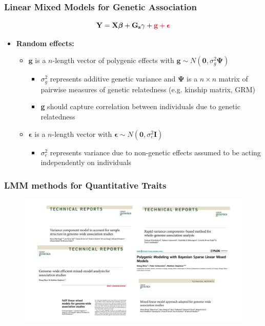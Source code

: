 \documentclass{beamer}
\newcommand{\bg}{\mathbf{g}}
\newcommand{\bepsilon}{\mbox{\boldmath$\epsilon$}}
\begin{document}
\begin{frame}
\frametitle{\bf Linear Mixed Models for Genetic Association}
\vspace{-5pt}
\begin{equation*}
\mathbf{Y}= \mathbf{X}\boldsymbol{\beta} + \mathbf{G_s}\gamma +  {\color{red}\bg  + \bepsilon }
\end{equation*}

\begin{itemize}
\item {\bf Random effects:}
\begin{itemize}
\item $\bg$ is a $n$-length vector of polygenic effects with  $\mathbf{g} \sim N(\mathbf{0},\sigma_g^2 \mathbf{\Psi})$
\begin{itemize}
\item   $\sigma^2_{g}$ represents additive genetic variance and $\mathbf{\Psi}$  is a $n\times n$ matrix of pairwise measures of genetic relatedness  (e.g. kinship matrix, GRM)
\item \textbf{g }should capture correlation between individuals due to genetic relatedness
\end{itemize}
\item $\boldsymbol{\epsilon}$ is a $n$-length vector with $ \boldsymbol\epsilon \sim N(\mathbf{0},\sigma_e^2 \mathbf{I})$
\begin{itemize}
\item $\sigma^2_{e}$  represents variance due to non-genetic effects assumed to be acting independently on individuals
\end{itemize}
\end{itemize}
\end{itemize}
\end{frame}


\begin{frame}
	\frametitle{\bf LMM methods for Quantitative Traits }
	\vspace{-2em}
	\begin{figure}
		\includegraphics[scale=.35]{Figures/plots_lmm}
	\end{figure}
\end{frame}
\end{document}
